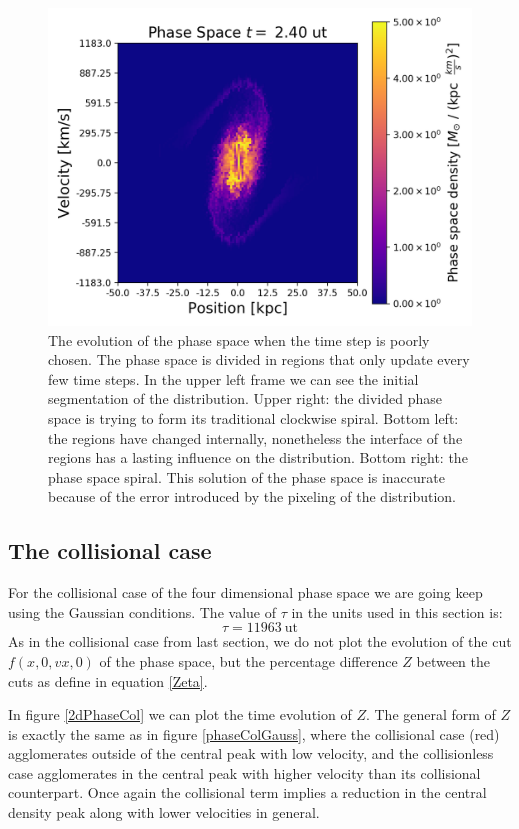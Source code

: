{\begin{figure}[h!]
    \includegraphics[scale=0.45]{imag/2dBad24.png}
    \caption{The evolution of the phase space when the time step is poorly chosen. The phase space is divided in regions that only update every few time steps. In the upper left frame we can see the initial segmentation of the distribution. Upper right: the divided phase space is trying to form its traditional clockwise spiral. Bottom left: the regions have changed internally, nonetheless the interface of the regions has a lasting influence on the distribution. Bottom right: the phase space spiral. This solution of the phase space is inaccurate because of the error introduced by the pixeling of the distribution.}
    \label{2dBadTime}
\end{figure}

\subsection{The collisional case}

For the collisional case of the four dimensional phase space we are going keep using the Gaussian conditions. The value of $\tau$ in the units used in this section is: $$\tau = 11963 \ \text{ut}$$ As in the collisional case from last section, we do not plot the evolution of the cut $f(x,0,vx,0)$ of the phase space, but the percentage difference $Z$ between the cuts as define in equation \ref{Zeta}.

In figure \ref{2dPhaseCol} we can plot the time evolution of $Z$. The general form of $Z$ is exactly the same as in figure \ref{phaseColGauss}, where the collisional case (red) agglomerates outside of the central peak with low velocity, and the collisionless case agglomerates in the central peak with higher velocity than its collisional counterpart.
Once again the collisional term implies a reduction in the central density peak along with lower velocities in general.



}
